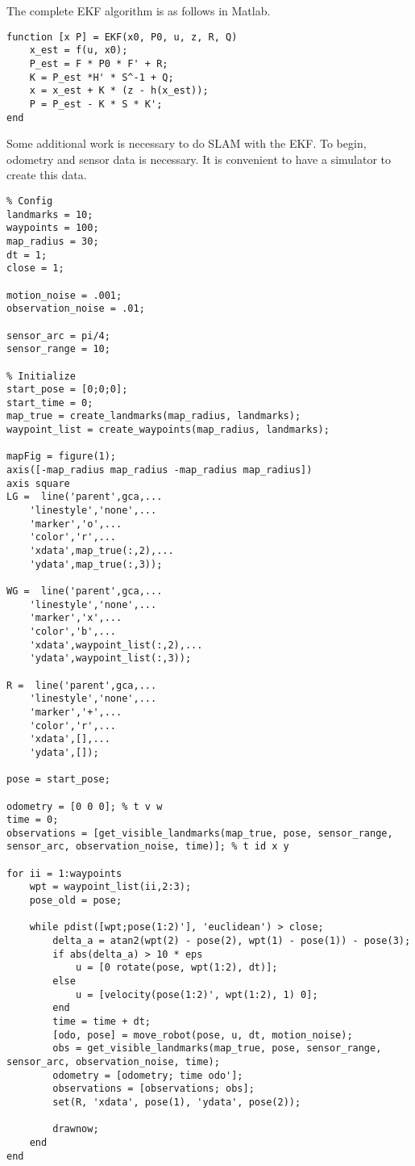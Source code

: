 \documentclass[12pt]{report}
\begin{document}
The complete EKF algorithm is as follows in Matlab.

\singlespacing
\begin{verbatim}
function [x P] = EKF(x0, P0, u, z, R, Q)
    x_est = f(u, x0);
    P_est = F * P0 * F' + R;
    K = P_est *H' * S^-1 + Q;
    x = x_est + K * (z - h(x_est));
    P = P_est - K * S * K';
end
\end{verbatim}
\doublespacing

Some additional work is necessary to do SLAM with the EKF.  To begin, odometry and sensor data is necessary.  It is convenient to have a simulator to create this data.  

\singlespacing
\begin{verbatim}
% Config
landmarks = 10;
waypoints = 100;
map_radius = 30;
dt = 1;
close = 1;

motion_noise = .001;
observation_noise = .01;

sensor_arc = pi/4;
sensor_range = 10;

% Initialize
start_pose = [0;0;0];
start_time = 0;
map_true = create_landmarks(map_radius, landmarks);
waypoint_list = create_waypoints(map_radius, landmarks);

mapFig = figure(1);
axis([-map_radius map_radius -map_radius map_radius])
axis square
LG =  line('parent',gca,...
    'linestyle','none',...
    'marker','o',...
    'color','r',...
    'xdata',map_true(:,2),...
    'ydata',map_true(:,3));

WG =  line('parent',gca,...
    'linestyle','none',...
    'marker','x',...
    'color','b',...
    'xdata',waypoint_list(:,2),...
    'ydata',waypoint_list(:,3));

R =  line('parent',gca,...
    'linestyle','none',...
    'marker','+',...
    'color','r',...
    'xdata',[],...
    'ydata',[]);

pose = start_pose;

odometry = [0 0 0]; % t v w
time = 0;
observations = [get_visible_landmarks(map_true, pose, sensor_range, sensor_arc, observation_noise, time)]; % t id x y

for ii = 1:waypoints
    wpt = waypoint_list(ii,2:3);
    pose_old = pose;

    while pdist([wpt;pose(1:2)'], 'euclidean') > close;
        delta_a = atan2(wpt(2) - pose(2), wpt(1) - pose(1)) - pose(3);
        if abs(delta_a) > 10 * eps
            u = [0 rotate(pose, wpt(1:2), dt)];
        else
            u = [velocity(pose(1:2)', wpt(1:2), 1) 0]; 
        end
        time = time + dt;
        [odo, pose] = move_robot(pose, u, dt, motion_noise);
        obs = get_visible_landmarks(map_true, pose, sensor_range, sensor_arc, observation_noise, time);
        odometry = [odometry; time odo'];
        observations = [observations; obs];
        set(R, 'xdata', pose(1), 'ydata', pose(2));
        
        drawnow;
    end
end
\end{verbatim}
\doublespacing
\end{document}
